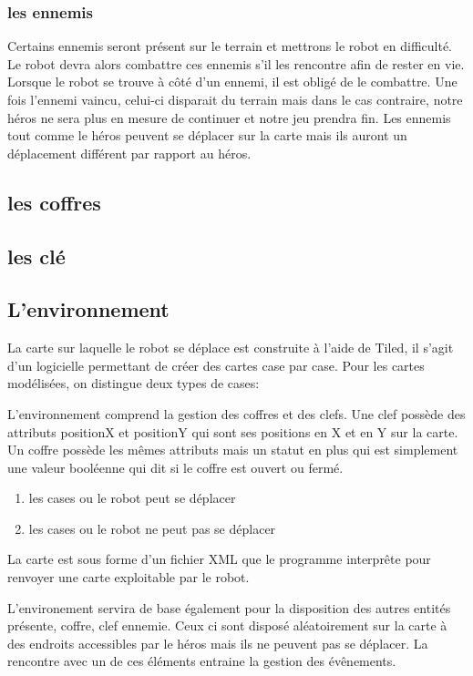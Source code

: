 \documentclass[a4paper 12pts]{article}
\begin{document}
\subsubsection{les ennemis}


Certains ennemis seront présent sur le terrain et mettrons le robot en difficulté. 
Le robot devra alors combattre ces ennemis s'il les rencontre afin de rester en vie.
Lorsque le robot se trouve à côté d'un ennemi, il est obligé de le combattre. 
Une fois l'ennemi vaincu, celui-ci disparait du terrain mais dans le cas contraire, 
notre héros ne sera plus en mesure de continuer et notre jeu prendra fin.
Les ennemis tout comme le héros peuvent se déplacer sur la carte mais ils auront un déplacement différent par rapport au héros.



\subsection{les coffres}

\subsection{les clé}

\subsection{L'environnement}
La carte sur laquelle le robot se déplace est construite à l'aide de Tiled, il s'agit d'un logicielle permettant de créer des cartes case par case. 
Pour les cartes modélisées, on distingue deux types de cases:

L'environnement comprend la gestion des coffres et des clefs.
Une clef possède des attributs positionX et positionY qui sont ses positions en X et en Y sur la carte. 
Un coffre possède les mêmes attributs mais un statut en plus qui est simplement une valeur booléenne qui dit si le coffre est ouvert ou fermé.


\begin{enumerate}
	\item les cases ou le robot peut se déplacer
	\item les cases ou le robot ne peut pas se déplacer
\end{enumerate}

La carte est sous forme d'un fichier XML que le programme interprête pour renvoyer une carte exploitable par le robot.

L'environement servira de base également pour la disposition des autres entités présente, coffre, clef ennemie.
Ceux ci sont disposé aléatoirement sur la carte à des endroits accessibles par le héros mais ils ne peuvent pas se déplacer.
La rencontre avec un de ces éléments entraine la gestion des évênements.
\end{document}
